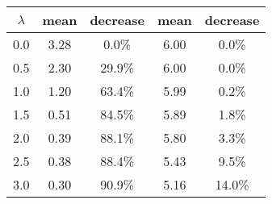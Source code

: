 \begin{tabular}{c||c|c||c|c}
\toprule
 $\lambda$ &  mean & decrease &  mean & decrease \\
\midrule
       0.0 &  3.28 &    0.0\% &  6.00 &    0.0\% \\
       0.5 &  2.30 &   29.9\% &  6.00 &    0.0\% \\
       1.0 &  1.20 &   63.4\% &  5.99 &    0.2\% \\
       1.5 &  0.51 &   84.5\% &  5.89 &    1.8\% \\
       2.0 &  0.39 &   88.1\% &  5.80 &    3.3\% \\
       2.5 &  0.38 &   88.4\% &  5.43 &    9.5\% \\
       3.0 &  0.30 &   90.9\% &  5.16 &   14.0\% \\
\bottomrule
\end{tabular}
